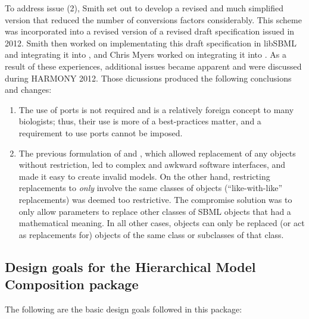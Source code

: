 To address issue (2), Smith set out to develop a revised and much
simplified version that reduced the number of conversions factors
considerably.  This scheme was incorporated into a revised version of a
revised draft specification issued in 2012.  Smith then worked on
implementating this draft specification in libSBML and integrating it
into , and Chris Myers
worked on integrating it into
.  As a result of
these experiences, additional issues became apparent and were discussed
during HARMONY 2012.  Those dicussions produced the following
conclusions and changes:

\begin{enumerate}

\item The use of ports is not required and is a relatively foreign
  concept to many biologists; thus, their use is more of a
  best-practices matter, and a requirement to use ports cannot be
  imposed.

\item The previous formulation of \ReplacedElement and \ReplacedBy,
  which allowed replacement of any objects without restriction, led to
  complex and awkward software interfaces, and made it easy to create
  invalid models.  On the other hand, restricting replacements to
  \emph{only} involve the same classes of objects (``like-with-like''
  replacements) was deemed too restrictive.  The compromise solution was
  to only allow parameters to replace other classes of SBML objects that
  had a mathematical meaning.  In all other cases, objects can only be
  replaced (or act as replacements for) objects of the same class or
  subclasses of that class.

\end{enumerate}



\subsection{Design goals for the Hierarchical Model Composition package}
\label{sec:design-goals}

The following are the basic design goals followed in this package:


